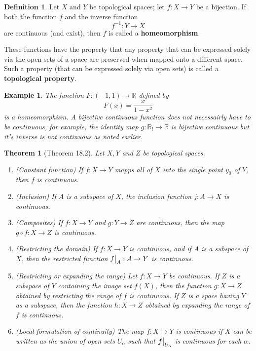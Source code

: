 \documentclass{article}
\newtheorem{theorem}{Theorem}
\newtheorem*{example}{Example}
\newcommand\restr[2]{{%
    \left.\kern-\nulldelimiterspace %
    #1 %
    \vphantom{\big|} %
    \right|_{#2} %
}}
\theoremstyle{definition}
\newtheorem{definition}{Definition}[section]
\theoremstyle{remark}
\begin{document}
    \begin{definition}
        Let $X$ and $Y$ be topological spaces; let $f: X\to Y$ be a bijection. If both the function $f$ and the inverse function
        \[ f^{-1}: Y \to X \]
        are continuous (and exist), then $f$ is called a \textbf{homeomorphism}.
    \end{definition}

    These functions have the property that any property that can be expressed solely via the open sets of a space are preserved
    when mapped onto a different space. Such a property (that can be expressed solely via open sets) is called a 
    \textbf{topological property}.

    \begin{example}
        The function $F: (-1,1) \to \mathbb{R}$ defined by
        \[ F(x) = \frac{x}{1-x^2} \]
        is a homeomorphism. A bijective continuous function does not necessairly have to be continuous, for example, the identity
        map $g: \mathbb{R}_l \to \mathbb{R}$ is bijective continuous but it's inverse is not continuous as noted earlier.
    \end{example}

    \begin{theorem}[Theorem 18.2]
        Let $X,Y$ and $Z$ be topological spaces.
        \begin{enumerate}
            \item (Constant function) If $f: X\to Y$ mapps all of $X$ into the single point $y_0$ of $Y$, then $f$ is continuous.
            \item (Inclusion) If $A$ is a subspace of $X$, the inclusion function $j: A\to X$ is continuous.
            \item (Composites) If $f: X\to Y$ and $g: Y\to Z$ are continuous, then the map $g\circ f: X\to Z$ is continuous.
            \item (Restricting the domain) If $f: X\to Y$ is continuous, and if $A$ is a subspace of $X$, then the restricted
                function $\restr{f}{A}: A\to Y$ is continuous.
            \item (Restricting or expanding the range) Let $f: X\to Y$ be continuous. If $Z$ is a subspace of $Y$ containing
                the image set $f(X)$, then the function $g: X\to Z$ obtained by restricting the range of $f$ is continuous. If
                $Z$ is a space having $Y$ as a subspace, then the function $h: X\to Z$ obtained by expanding the range of $f$
                is continuous.
            \item (Local formulation of continuity) The map $f:X\to Y$ is continuous if $X$ can be written as the union of open
                sets $U_{\alpha}$ such that $\restr{f}{U_{\alpha}}$ is continuous for each $\alpha$.
        \end{enumerate}
    \end{theorem}
\end{document}
